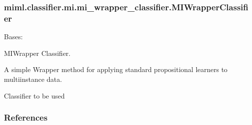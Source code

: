 \documentclass[letterpaper,10pt,english]{sphinxmanual}
\begin{document}
\sphinxstepscope


\subsubsection{miml.classifier.mi.mi\_wrapper\_classifier.MIWrapperClassifier}
\label{\detokenize{classifier/mi/_autosummary/miml.classifier.mi.mi_wrapper_classifier.MIWrapperClassifier:miml-classifier-mi-mi-wrapper-classifier-miwrapperclassifier}}\label{\detokenize{classifier/mi/_autosummary/miml.classifier.mi.mi_wrapper_classifier.MIWrapperClassifier::doc}}

\begin{fulllineitems}
\label{\detokenize{classifier/mi/_autosummary/miml.classifier.mi.mi_wrapper_classifier.MIWrapperClassifier:miml.classifier.mi.mi_wrapper_classifier.MIWrapperClassifier}}
\pysigstartsignatures
\pysiglinewithargsret
{}
{}
{}
\pysigstopsignatures
\sphinxAtStartPar
Bases: 

\sphinxAtStartPar
MIWrapper Classifier.

\sphinxAtStartPar
A simple Wrapper method for applying standard propositional learners to multi\sphinxhyphen{}instance data.

\begin{fulllineitems}
\label{\detokenize{classifier/mi/_autosummary/miml.classifier.mi.mi_wrapper_classifier.MIWrapperClassifier:miml.classifier.mi.mi_wrapper_classifier.MIWrapperClassifier.base_classifier}}
\pysigstartsignatures
\pysigline
{}
\pysigstopsignatures
\sphinxAtStartPar
Classifier to be used

\end{fulllineitems}

\subsubsection*{References}


\end{fulllineitems}
\end{document}
